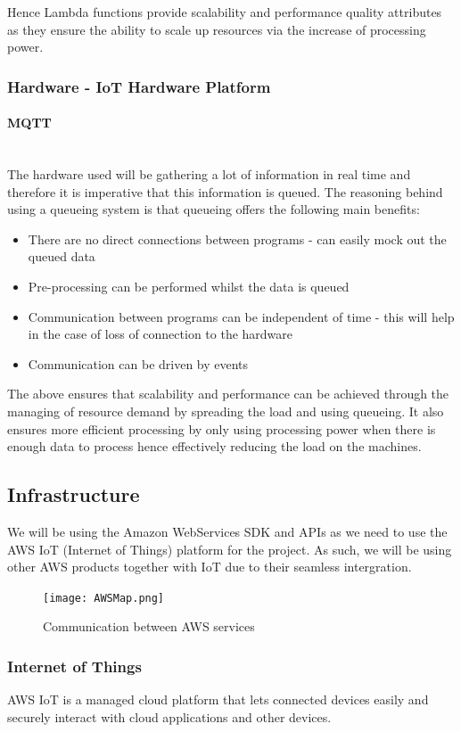 \documentclass{article}
\begin{document}
		Hence Lambda functions provide scalability and performance quality attributes as they ensure the ability to scale up resources via the increase of processing power.
	\subsubsection{Hardware - IoT Hardware Platform}
		\paragraph{MQTT}\mbox{}\\
		The hardware used will be gathering a lot of information in real time and therefore it is imperative that this information is queued. The reasoning behind using a queueing system is that queueing offers the following main benefits:
		\begin{itemize}
			\item There are no direct connections between programs - can easily mock out the queued data
			\item Pre-processing can be performed whilst the data is queued
			\item Communication between programs can be independent of time - this will help in the case of loss of connection to the hardware
			\item Communication can be driven by events
		\end{itemize}
		
		The above ensures that scalability and performance can be achieved through the managing of resource demand by spreading the load and using queueing. It also ensures more efficient processing by only using processing power when there is enough data to process hence effectively reducing the load on the machines.
	
\subsection{Infrastructure}
	We will be using the Amazon WebServices SDK and APIs as we need to use the AWS IoT (Internet of Things) platform for the project. As such, we will be using other AWS products together with IoT due to their seamless intergration.
		\begin{figure}[H]
			\centering
			\texttt{[image: AWSMap.png]}
			\caption{Communication between AWS services}
		\end{figure}
	\subsubsection{Internet of Things}
		AWS IoT is a managed cloud platform that lets connected devices easily and securely interact with cloud applications and other devices.
		
\end{document}
